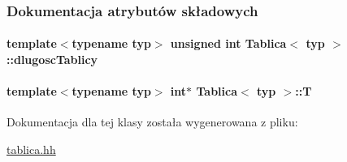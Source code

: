 \subsubsection{Dokumentacja atrybutów składowych}
\hypertarget{class_tablica_a58987190dfda933e6e5c7e2b8ebf7be0}{
\paragraph[{dlugosc\-Tablicy}]{\setlength{\rightskip}{0pt plus 5cm}template$<$typename typ$>$ unsigned int {\bf Tablica}$<$ typ $>$\-::dlugosc\-Tablicy\hspace{0.3cm}{\ttfamily [private]}}}\label{class_tablica_a58987190dfda933e6e5c7e2b8ebf7be0}
\hypertarget{class_tablica_a35a881c3f637dc3ef56f0ce6a2084f3c}{
\paragraph[{T}]{\setlength{\rightskip}{0pt plus 5cm}template$<$typename typ$>$ int$\ast$ {\bf Tablica}$<$ typ $>$\-::T\hspace{0.3cm}{\ttfamily [private]}}}\label{class_tablica_a35a881c3f637dc3ef56f0ce6a2084f3c}


Dokumentacja dla tej klasy została wygenerowana z pliku\-:\begin{DoxyCompactItemize}
\item 
\hyperlink{tablica_8hh}{tablica.\-hh}\end{DoxyCompactItemize}

